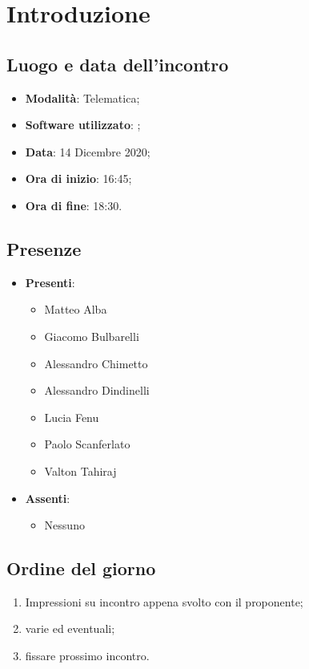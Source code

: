 \documentclass[]{article}
\begin{document}
	

	\newpage


	\section{Introduzione}
		\subsection{Luogo e data dell'incontro}
		\begin{itemize}
			\item \textbf{Modalità}: Telematica;
			\item \textbf{Software utilizzato}: ;
			\item \textbf{Data}: 14 Dicembre 2020;
			\item \textbf{Ora di inizio}: 16:45;
			\item \textbf{Ora di fine}: 18:30.
		\end{itemize}

		\subsection{Presenze}
		\begin{itemize}
			\item \textbf{Presenti}:
			\begin{itemize}
				\item Matteo Alba
				\item Giacomo Bulbarelli
				\item Alessandro Chimetto
				\item Alessandro Dindinelli
				\item Lucia Fenu
				\item Paolo Scanferlato
				\item Valton Tahiraj
			\end{itemize}
			\item \textbf{Assenti}:
			\begin{itemize}
				\item Nessuno
			\end{itemize}
		\end{itemize}


		\subsection{Ordine del giorno}
		\begin{enumerate}
			\item Impressioni su incontro appena svolto con il proponente;
			\item varie ed eventuali;
			\item fissare prossimo incontro.
		\end{enumerate}
\end{document}
